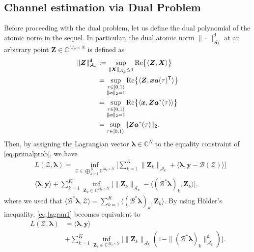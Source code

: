 \documentclass[conference,10pt]{IEEEtran}
\theoremstyle{remark}
\theoremstyle{plain}
\theoremstyle{definition}
\theoremstyle{remark}
\begin{document}
 \subsection{Channel estimation via Dual Problem}
Before proceeding with the dual problem, let us define the dual polynomial of the atomic norm in the sequel.  In particular, the dual atomic norm $\|\cdot\|_{\mathcal{A}_k}^{\mathsf{d}}$ at an arbitrary point $\bm{Z}\in \mathbb{C}^{M_k\times N}$ is defined as
\begin{align}\label{eq.dualnorm1}
\|\bm{Z}\|_{\mathcal{A}_k}^{\mathsf{d}}&:=\sup_{\|\bm{X}\|_{\mathcal{A}_k}\le 1}{\rm Re}\big\{\langle \bm{Z}, \bm{X} \rangle\big\}\nonumber\\
&=\sup_{\substack{\tau\in [0,1)\\\|\bm{x}\|_2=1}}{\rm Re}\big\{\langle \bm{Z}, \bm{x}\bm{a}(\tau)^{\mathsf{T}} \rangle\big\} \nonumber\\
&=\sup_{\substack{\tau\in [0,1)\\ \|\bm{x}\|_2=1}}{\rm Re}\big\{\langle \bm{x}, \bm{Z}\bm{a}^*(\tau) \rangle\big\}\nonumber \\ 
& =\sup_{\tau\in [0,1)}\|\bm{Z}\bm{a}^*(\tau)\|_2.
\end{align}
Then, by assigning the Lagrangian vector $\bm{\lambda}\in\mathbb{C}^N$ to the equality constraint of \eqref{eq.primalprob}, we have
\begin{align}\label{eq.lagran1}
&L(\bm{\mathcal{Z}},\bm{\lambda})=\inf _{\bm{\mathcal{Z}}\in\bigoplus_{k=1}^K\mathbb{C}^{M_k\times N}}\Big[\sum_{k=1}^K\|\bm{Z}_k\|_{\mathcal{A}_k}+\langle \bm{\lambda},\bm{y}-\mathcal{B}(\bm{\mathcal{Z}}) \rangle\Big]\nonumber\\
&\langle \bm{\lambda},\bm{y}\rangle+\sum_{k=1}^K\inf_{\bm{Z}_k\in\mathbb{C}^{M_k\times N}}\Big[\|\bm{Z}_k\|_{\mathcal{A}_k}-\langle (\mathcal{B}^*\bm{\lambda})_k, \bm{Z}_k \rangle\Big],
\end{align}
where we used that $\langle \mathcal{B}^*\bm{\lambda}, \bm{\mathcal{Z}}\rangle=\sum_{k=1}^K\langle (\mathcal{B}^*\bm{\lambda})_k, \bm{Z}_k\rangle.$
By using H\"{o}lder's inequality, \eqref{eq.lagran1} becomes equivalent to
\begin{align}
\nonumber L(\bm{\mathcal{Z}},\bm{\lambda})&=\langle  \bm{\lambda},\bm{y}\rangle
\\
& \nonumber+\sum_{k=1}^K\inf_{\bm{Z}_k\in\mathbb{C}^{M_k\times N}}\Big[\|\bm{Z}_k\|_{\mathcal{A}_k}(1-\|(\mathcal{B}^*\bm{\lambda})_k\|_{\mathcal{A}_k}^{\mathsf{d}})\Big].
\end{align}
\end{document}

